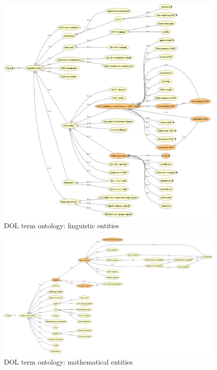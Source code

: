 \documentclass[10pt,fleqn,final]{scrreprt}
\newenvironment{definitions}[0]{\medskip }{}
\begin{document}
\begin{definitions}
\begin{figure}
  \centering
    \includegraphics[width=1\textwidth]{illustrations/linguistic-entity.png}
  \caption{DOL term ontology: linguistic entities}
  \label{fig:linguistic-entity}
\end{figure}

\begin{figure}
  \centering
    \includegraphics[width=1\textwidth]{illustrations/mathematical-entity.png}
  \caption{DOL term ontology: mathematical entities}
  \label{fig:mathematical-entity}
\end{figure}


\end{definitions}
\end{document}
